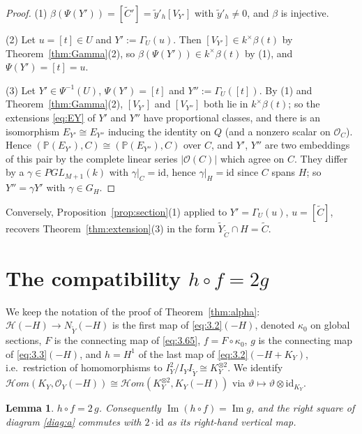 \documentclass[11pt,reqno]{amsart}
\theoremstyle{plain}
\newtheorem{lemma}[theorem]{Lemma}
\theoremstyle{definition}
\newcommand{\PP}{\mathbb{P}}
\newcommand{\OO}{\mathcal{O}}
\newcommand{\sHom}{\mathcal{H}om}
\renewcommand{\Im}{\operatorname{Im}}
\newcommand{\id}{\mathrm{id}}
\newcommand{\Yt}{\widetilde{Y}}
\newcommand{\Ct}{\widetilde{C}}
\newcommand{\yt}{\tilde{y}}
\newcommand{\NYt}{N_{\Yt}}
\newcommand{\Hc}{\mathcal{H}}
\newcommand{\GH}{G_H}
\begin{document}
\begin{proof}
(1) $\beta(\Psi(Y'))=[\Ct']=\yt'_h[V_{Y'}]$ with $\yt'_h\ne0$, and $\beta$ is injective.

(2) Let $u=[t]\in U$ and $Y':=\Gamma_U(u)$. Then $[V_{Y'}]\in k^{\times}\beta(t)$ by Theorem~\ref{thm:Gamma}(2), so $\beta(\Psi(Y'))\in k^{\times}\beta(t)$ by (1), and $\Psi(Y')=[t]=u$.

(3) Let $Y'\in\Psi^{-1}(U)$, $\Psi(Y')=[t]$ and $Y'':=\Gamma_U([t])$. By (1) and Theorem~\ref{thm:Gamma}(2), $[V_{Y'}]$ and $[V_{Y''}]$ both lie in $k^{\times}\beta(t)$; so the extensions \eqref{eq:EY} of $Y'$ and $Y''$ have proportional classes, and there is an isomorphism $E_{Y'}\cong E_{Y''}$ inducing the identity on $Q$ (and a nonzero scalar on $\OO_C$). Hence $(\PP(E_{Y'}),C)\cong(\PP(E_{Y''}),C)$ over $C$, and $Y'$, $Y''$ are two embeddings of this pair by the complete linear series $|\OO(C)|$ which agree on $C$. They differ by a $\gamma\in PGL_{M+1}(k)$ with $\gamma|_C=\id$, hence $\gamma|_H=\id$ since $C$ spans $H$; so $Y''=\gamma Y'$ with $\gamma\in\GH$.
\end{proof}


Conversely, Proposition~\ref{prop:section}(1) applied to $Y'=\Gamma_U(u)$, $u=[\Ct]$, recovers Theorem~\ref{thm:extension}(3) in the form $\Yt_{\Ct}\cap H=\Ct$.

\appendix

\section{The compatibility \texorpdfstring{$h\circ f=2g$}{h o f = 2g}}\label{app:hfg}

We keep the notation of the proof of Theorem~\ref{thm:alpha}: $\Hc(-H)\to\NYt(-H)$ is the first map of \eqref{eq:3.2}$(-H)$, denoted $\kappa_0$ on global sections, $F$ is the connecting map of \eqref{eq:3.65}, $f=F\circ\kappa_0$, $g$ is the connecting map of \eqref{eq:3.3}$(-H)$, and $h=H^1$ of the last map of \eqref{eq:3.2}$(-H+K_Y)$, i.e.\ restriction of homomorphisms to $I_Y^2/I_YI_{\Yt}\cong K_Y^{\otimes 2}$. We identify $\sHom(K_Y,\OO_Y(-H))\cong\sHom(K_Y^{\otimes2},K_Y(-H))$ via $\vartheta\mapsto\vartheta\otimes\id_{K_Y}$.

\begin{lemma}\label{lem:hfg}
$h\circ f=2\,g$. Consequently $\Im(h\circ f)=\Im g$, and the right square of diagram \eqref{diag:a} commutes with $2\cdot\id$ as its right-hand vertical map.
\end{lemma}
\end{document}
